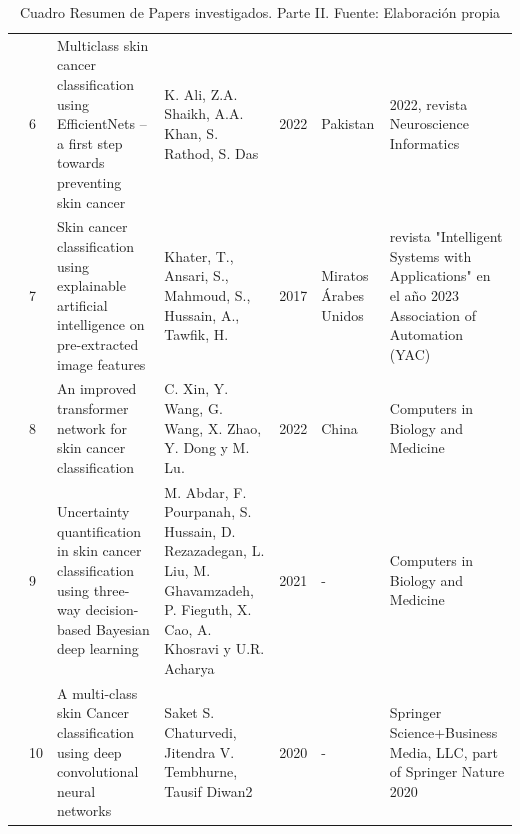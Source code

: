 \begin{table}[h]
\begin{longtable}{|m{0.5cm}|m{0.3cm}|m{4cm}|m{2cm}|m{0.6cm}|m{1.7cm}|m{3cm}|}
		
		& 6                                             & Multiclass skin cancer classification using EfficientNets – a first step towards preventing skin cancer~                   & K. Ali, Z.A. Shaikh, A.A. Khan, S. Rathod, S. Das                                      & 2022                                        & Pakistan                                        & 2022, revista Neuroscience Informatics \\ 
		\cline{2-7}
		& 7                                             & Skin cancer classification using explainable artificial intelligence on pre-extracted image features & Khater, T., Ansari, S., Mahmoud, S., Hussain, A., Tawfik, H. & 2017 & Miratos Árabes Unidos          & revista "Intelligent Systems with Applications" en el año 2023
		Association of Automation (YAC)~              \\ 
		\cline{2-7}
		& 8                                             & An improved transformer network for skin cancer classification
		&  C. Xin, Y. Wang, G. Wang, X. Zhao, Y. Dong y M. Lu.~             & 2022                                        & China                                          & Computers in Biology and Medicine              \\ 
		\cline{2-7}
		& 9                                             & Uncertainty quantification in skin cancer classification using three-way decision-based Bayesian deep learning                                                                      & M. Abdar, F. Pourpanah, S. Hussain, D. Rezazadegan, L. Liu, M. Ghavamzadeh, P. Fieguth, X. Cao, A. Khosravi y U.R. Acharya                                   & 2021                                        & -                                          & Computers in Biology and Medicine                          \\
		\cline{2-7}
		& 10                                             &A multi-class skin Cancer classification using deep convolutional neural networks    & Saket S. Chaturvedi, Jitendra V. Tembhurne, Tausif Diwan2 & 2020                               & -         & Springer Science+Business Media, LLC, part of Springer Nature 2020 \\
		\hline
	\end{longtable}
	\caption{Cuadro Resumen de Papers investigados. Parte II. Fuente: Elaboración propia}
	\label{A:table}
\end{table}



